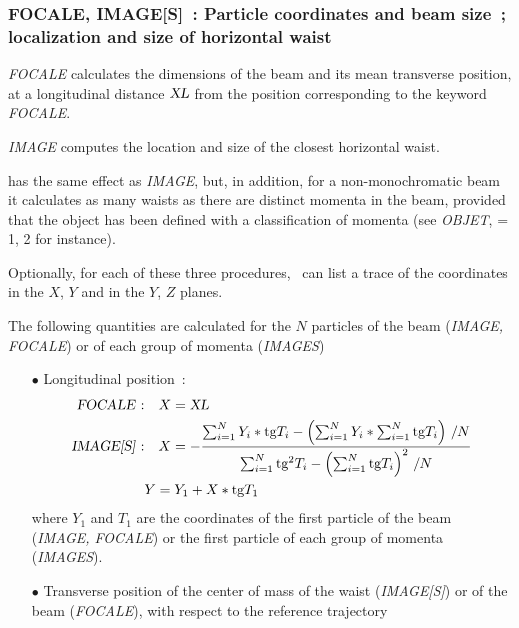{\subsubsection{FOCALE, IMAGE[S]~: Particle coordinates and beam size~;  localization and
size  of  horizontal waist}\label{FOCALE}\label{IMAGE}\label{IMAGES}
\medskip 

\textsl{FOCALE}  calculates the dimensions of the beam and its mean 
transverse position, at a longitudinal distance $ \textsl{XL} $ from the position 
corresponding to the keyword \textsl{FOCALE}.  
\medskip

\noindent\textsl{IMAGE}  computes the location and size
of the closest horizontal waist.  
\medskip

\noindent\IMAGES{}  has the same effect as \textsl{IMAGE},
 but, in addition, for a 
non-monochromatic beam it calculates as many waists as there are distinct momenta in 
the beam, provided that the object has been defined with a classification of momenta 
(see \textsl{OBJET}, \KOBJ = 1, 2  for instance).  
\medskip

\noindent Optionally, for each of these three procedures, \zgou\ can
list a trace of the coordinates in the $ X$, $Y $ and in the $ Y$, $Z $ planes.  
\medskip

\noindent The following quantities are calculated for the $ N $ particles of
the beam (\textsl{IMAGE,   FOCALE}) or of each group    of momenta 
(\textsl{IMAGES})  
\medskip

\begin{itemize}
\item[$\bullet$]Longitudinal position~: 
       \begin{align*}
       \text{\textsl{FOCALE}~:} & \quad  X=\XL  \\
       \text{\textsl{IMAGE[S]}~:} & \quad   X    = - 
    \dfrac{ \sum^ N_{i=1}Y_i\ast \text{tg} T_i- 
         \left( \sum^ N_{i=1}Y_i\ast \sum^N_{i=1}\text{tg} T_i \right)\, /N }{%
        \sum^ N_{i=1}\text{tg} ^2T_i- \left( \sum^ N_{i=1}\text{tg} T_i\right)^2\, /N} \\ 
            & Y   =   Y_1+X  \ast   \text{tg} T_1  
        \end{align*}    
where $ Y_1 $ and $ T_1 $ are the coordinates of the first particle
of the beam (\textsl{IMAGE, FOCALE}) or the first particle of each group of momenta 
(\textsl{IMAGES}). 

\item[$\bullet$]Transverse position of the center of mass of the waist 
(\textsl{IMAGE[S]}) or of the beam (\textsl{FOCALE}), with respect to the reference trajectory 


\end{itemize}}
